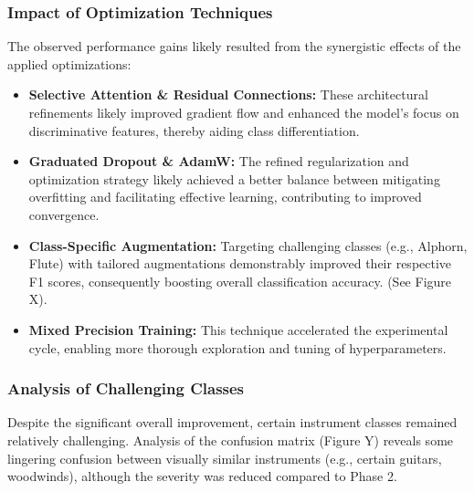 
\subsubsection{Impact of Optimization Techniques}
The observed performance gains likely resulted from the synergistic effects of the applied optimizations:
\begin{itemize}
    \item \textbf{Selective Attention & Residual Connections:} These architectural refinements likely improved gradient flow and enhanced the model's focus on discriminative features, thereby aiding class differentiation.
    \item \textbf{Graduated Dropout & AdamW:} The refined regularization and optimization strategy likely achieved a better balance between mitigating overfitting and facilitating effective learning, contributing to improved convergence.
    \item \textbf{Class-Specific Augmentation:} Targeting challenging classes (e.g., Alphorn, Flute) with tailored augmentations demonstrably improved their respective F1 scores, consequently boosting overall classification accuracy. (See Figure X).
    \item \textbf{Mixed Precision Training:} This technique accelerated the experimental cycle, enabling more thorough exploration and tuning of hyperparameters.
\end{itemize}


\subsubsection{Analysis of Challenging Classes}
Despite the significant overall improvement, certain instrument classes remained relatively challenging. Analysis of the confusion matrix (Figure Y) reveals some lingering confusion between visually similar instruments (e.g., certain guitars, woodwinds), although the severity was reduced compared to Phase 2.


